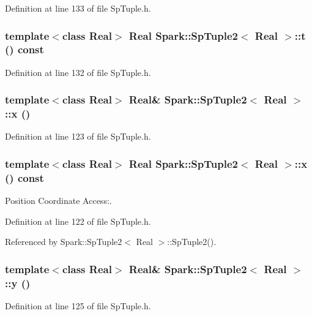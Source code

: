Definition at line 133 of file Sp\-Tuple.h.
\subsubsection{\setlength{\rightskip}{0pt plus 5cm}template$<$class Real$>$ Real {\bf Spark::Sp\-Tuple2}$<$ Real $>$::t () const\hspace{0.3cm}{\tt  [inline]}}\label{classSpark_1_1SpTuple2_a8}


Definition at line 132 of file Sp\-Tuple.h.
\subsubsection{\setlength{\rightskip}{0pt plus 5cm}template$<$class Real$>$ Real\& {\bf Spark::Sp\-Tuple2}$<$ Real $>$::x ()\hspace{0.3cm}{\tt  [inline]}}\label{classSpark_1_1SpTuple2_a3}


Definition at line 123 of file Sp\-Tuple.h.
\subsubsection{\setlength{\rightskip}{0pt plus 5cm}template$<$class Real$>$ Real {\bf Spark::Sp\-Tuple2}$<$ Real $>$::x () const\hspace{0.3cm}{\tt  [inline]}}\label{classSpark_1_1SpTuple2_a2}


Position Coordinate Access:. 

Definition at line 122 of file Sp\-Tuple.h.

Referenced by Spark::Sp\-Tuple2$<$ Real $>$::Sp\-Tuple2().
\subsubsection{\setlength{\rightskip}{0pt plus 5cm}template$<$class Real$>$ Real\& {\bf Spark::Sp\-Tuple2}$<$ Real $>$::y ()\hspace{0.3cm}{\tt  [inline]}}\label{classSpark_1_1SpTuple2_a5}


Definition at line 125 of file Sp\-Tuple.h.
